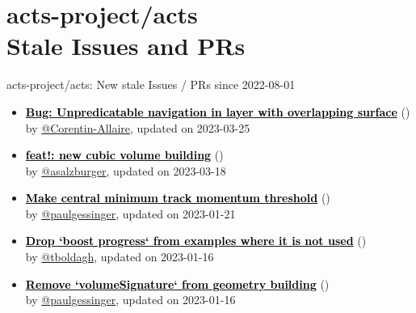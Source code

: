 \section{ acts-project/acts \\ Stale Issues and PRs}
\begin{frame}[allowframebreaks]{ acts-project/acts: New stale Issues / PRs since 2022-08-01 }
  \begin{itemize}
    
    \item\iss\prstale\textbf{\href{https://github.com/acts-project/acts/issues/1852}{\textcolor{black}{Bug: Unpredicatable navigation in layer with overlapping surface}}}
    (\href{https://github.com/acts-project/acts/issues/1852}{}) \\
    by \href{https://github.com/Corentin-Allaire}{@Corentin-Allaire}, updated on 2023-03-25

    \item\propen\prwip\prstale\textbf{\href{https://github.com/acts-project/acts/pull/1821}{\textcolor{black}{feat!: new cubic volume building}}}
    (\href{https://github.com/acts-project/acts/pull/1821}{}) \\
    by \href{https://github.com/asalzburger}{@asalzburger}, updated on 2023-03-18

    \item\iss\prstale\textbf{\href{https://github.com/acts-project/acts/issues/1761}{\textcolor{black}{Make central minimum track momentum threshold}}}
    (\href{https://github.com/acts-project/acts/issues/1761}{}) \\
    by \href{https://github.com/paulgessinger}{@paulgessinger}, updated on 2023-01-21

    \item\iss\prstale\textbf{\href{https://github.com/acts-project/acts/issues/1736}{\textcolor{black}{Drop `boost progress` from examples where it is not used}}}
    (\href{https://github.com/acts-project/acts/issues/1736}{}) \\
    by \href{https://github.com/tboldagh}{@tboldagh}, updated on 2023-01-16

    \item\iss\prstale\textbf{\href{https://github.com/acts-project/acts/issues/1731}{\textcolor{black}{Remove `volumeSignature` from geometry building}}}
    (\href{https://github.com/acts-project/acts/issues/1731}{}) \\
    by \href{https://github.com/paulgessinger}{@paulgessinger}, updated on 2023-01-16


\end{itemize}
\end{frame}
